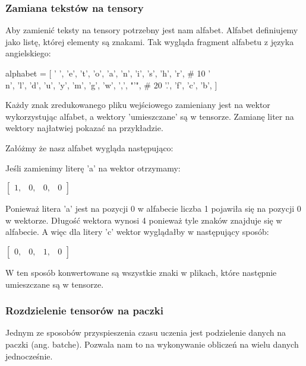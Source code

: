 \newpage
\subsubsection{Zamiana tekstów na tensory}
Aby zamienić teksty na tensory potrzebny jest nam alfabet. Alfabet definiujemy jako listę, której 
elementy są znakami. Tak wygląda fragment alfabetu z języka angielskiego:
\begin{python}
alphabet = [
    ' ',
    'e',
    't',
    'o',
    'a',
    'n',
    'i',
    's',
    'h',
    'r',  # 10
    '\\n',
    'l',
    'd',
    'u',
    'y',
    'm',
    'g',
    'w',
    ',',
    "'",  # 20
    '.',
    'f',
    'c',
    'b',
]
\end{python}

Każdy znak zredukowanego pliku wejściowego zamieniany jest na wektor wykorzystując alfabet, 
a wektory 'umieszczane' są w tensorze. Zamianę liter na wektory najłatwiej pokazać na przykładzie.

Załóżmy że nasz alfabet wygląda następująco:

Jeśli zamienimy literę 'a' na wektor otrzymamy: 
 
\vspace{2mm}
$
\begin{bmatrix} 
1, & 0, & 0, & 0
\end{bmatrix} 
$
\vspace{2mm}

Ponieważ litera 'a' jest na pozycji 0 w alfabecie liczba 1 pojawiła się na pozycji 0 w wektorze.
Długość wektora wynosi 4 ponieważ tyle znaków znajduje się w alfabecie. A więc dla litery 
'c' wektor wyglądałby w następujący sposób:

\vspace{2mm}
$
\begin{bmatrix} 
0, & 0, & 1, & 0
\end{bmatrix} 
$
\vspace{2mm}

W ten sposób konwertowane są wszystkie znaki w plikach, które następnie umieszczane są w tensorze.

\subsubsection{Rozdzielenie tensorów na paczki}
Jednym ze sposobów przyspieszenia czasu uczenia jest podzielenie danych na paczki (ang. batche).
Pozwala nam to na wykonywanie obliczeń na wielu danych jednocześnie.

